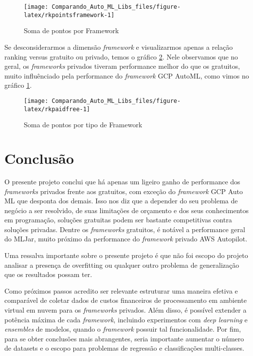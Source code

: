 \documentclass[9pt, a4paper, twocolumn]{article}
\begin{document}
\begin{figure}[h]

{\centering \texttt{[image: Comparando\_Auto\_ML\_Libs\_files/figure-latex/rkpointsframework-1]} 

}

\caption{Soma de pontos por Framework}\label{fig:rkpointsframework}
\end{figure}

Se desconsiderarmos a dimensão \emph{framework} e visualizarmos apenas a relação ranking versus gratuito ou privado, temos o gráfico \ref{fig:rkpaidfree}. Nele observamos que no geral, os \emph{frameworks} privados tiveram performance melhor do que os gratuitos, muito influênciado pela performance do \emph{framework} GCP AutoML, como vimos no gráfico \ref{fig:rkpointsframework}.

\begin{figure}[h]

{\centering \texttt{[image: Comparando\_Auto\_ML\_Libs\_files/figure-latex/rkpaidfree-1]} 

}

\caption{Soma de pontos por tipo de Framework}\label{fig:rkpaidfree}
\end{figure}

\hypertarget{conclusuxe3o}{%
\section{Conclusão}\label{conclusuxe3o}}

O presente projeto conclui que há apenas um ligeiro ganho de performance dos \emph{frameworks} privados frente aos gratuitos, com exceção do \emph{framework} GCP Auto ML que desponta dos demais. Isso nos diz que a depender do seu problema de negócio a ser resolvido, de suas limitações de orçamento e dos seus conhecimentos em programação, soluções gratuitas podem ser bastante competitivas contra soluções privadas. Dentre os \emph{frameworks} gratuitos, é notável a performance geral do MLJar, muito próximo da performance do \emph{framework} privado AWS Autopilot.

Uma ressalva importante sobre o presente projeto é que não foi escopo do projeto analisar a presença de overfitting ou qualquer outro problema de generalização que os resultados possam ter.

Como próximos passos acredito ser relevante estruturar uma maneira efetiva e comparável de coletar dados de custos financeiros de processamento em ambiente virtual em nuvem para os \emph{frameworks} privados. Além disso, é possível extender a potência máxima de cada \emph{framework}, incluindo experimentos com \emph{deep learning} e \emph{ensembles} de modelos, quando o \emph{framework} possuir tal funcionalidade. Por fim, para se obter conclusões mais abrangentes, seria importante aumentar o número de datasets e o escopo para problemas de regressão e classificações multi-classes.


%
%
\end{document}
